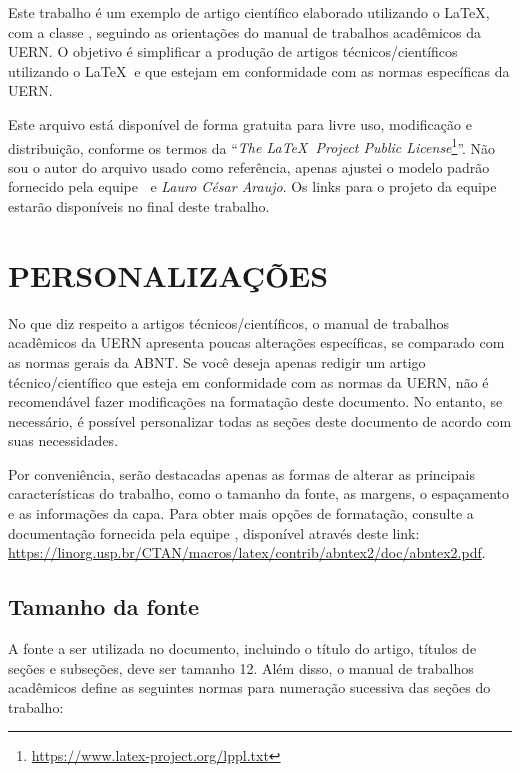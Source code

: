 \documentclass[
article,			%
12pt,				%
oneside,			%
a4paper,			%
english,			%
brazil,				%
sumario=tradicional
]{abntex2}
\begin{document}
	Este trabalho é um exemplo de artigo científico elaborado utilizando o \LaTeX, com a classe \abnTeX, seguindo as orientações do manual de trabalhos acadêmicos da UERN. O objetivo é simplificar a produção de artigos técnicos/científicos utilizando o \LaTeX $~$ e que estejam em conformidade com as normas específicas da UERN.
	
	Este arquivo está disponível de forma gratuita para livre uso, modificação e distribuição, conforme os termos da “\emph{The \LaTeX $~$ Project Public License}\footnote{\url{https://www.latex-project.org/lppl.txt}}”. Não sou o autor do arquivo usado como referência, apenas ajustei o modelo padrão fornecido pela equipe \abnTeX $~$ e \emph{Lauro César Araujo}. Os links para o projeto da equipe \abnTeX $~$ estarão disponíveis no final deste trabalho.
	\section{PERSONALIZAÇÕES}

    No que diz respeito a artigos técnicos/científicos, o manual de trabalhos acadêmicos da UERN apresenta poucas alterações específicas, se comparado com as normas gerais da ABNT. Se você deseja apenas redigir um artigo técnico/científico que esteja em conformidade com as normas da UERN, não é recomendável fazer modificações na formatação deste documento. No entanto, se necessário, é possível personalizar todas as seções deste documento de acordo com suas necessidades.

    Por conveniência, serão destacadas apenas as formas de alterar as principais características do trabalho, como o tamanho da fonte, as margens, o espaçamento e as informações da capa. Para obter mais opções de formatação, consulte a documentação fornecida pela equipe \abnTeX, disponível através deste link: \url{https://linorg.usp.br/CTAN/macros/latex/contrib/abntex2/doc/abntex2.pdf}.
 
	\subsection{Tamanho da fonte}

    A fonte a ser utilizada no documento, incluindo o título do artigo, títulos de seções e subseções, deve ser tamanho 12. Além disso, o manual de trabalhos acadêmicos define as seguintes normas para numeração sucessiva das seções do trabalho:
    
\end{document}
